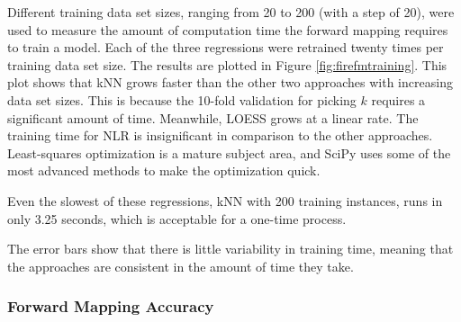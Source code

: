 Different training data set sizes, ranging from 20 to 200 (with a step of 20), were used to measure the amount of computation time the forward mapping requires to train a model.
Each of the three regressions were retrained twenty times per training data set size.
The results are plotted in Figure \ref{fig:firefmtraining}.
This plot shows that kNN grows faster than the other two approaches with increasing data set sizes.
This is because the 10-fold validation for picking $k$ requires a significant amount of time.
Meanwhile, LOESS grows at a linear rate.
The training time for NLR is insignificant in comparison to the other approaches.
Least-squares optimization is a mature subject area, and SciPy uses some of the most advanced methods to make the optimization quick.

Even the slowest of these regressions, kNN with 200 training instances, runs in only 3.25 seconds, which is acceptable for a one-time process.


The error bars show that there is little variability in training time, meaning that the approaches are consistent in the amount of time they take.


\subsubsection{Forward Mapping Accuracy}

